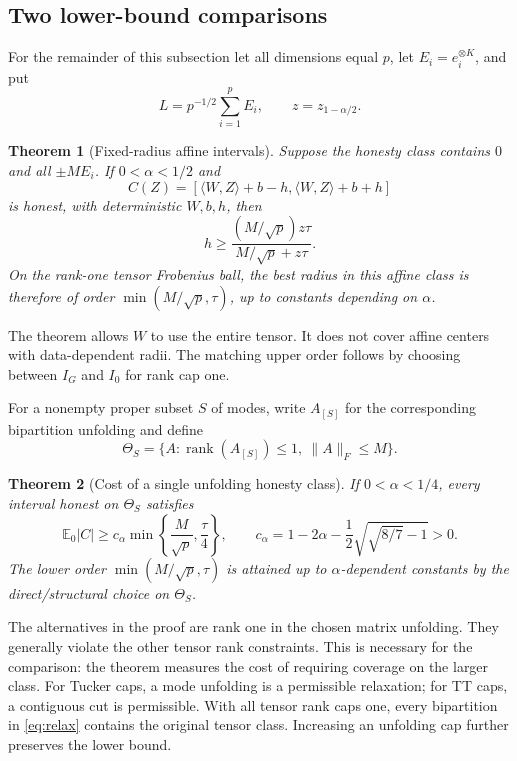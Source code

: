 \documentclass[11pt]{article}
\newtheorem{theorem}{Theorem}
\theoremstyle{remark}
\newcommand{\E}{\mathbb E}
\newcommand{\ip}[2]{\langle #1,#2\rangle}
\newcommand{\norm}[1]{\lVert #1\rVert}
\newcommand{\rank}{\operatorname{rank}}
\begin{document}
\subsection{Two lower-bound comparisons}

For the remainder of this subsection let all dimensions equal $p$, let $E_i=e_i^{\otimes K}$, and put
\begin{equation}\label{eq:equalL}
 L=p^{-1/2}\sum_{i=1}^p E_i,\qquad z=z_{1-\alpha/2}.
\end{equation}

\begin{theorem}[Fixed-radius affine intervals]\label{thm:affine}
Suppose the honesty class contains $0$ and all $\pm M E_i$. If $0<\alpha<1/2$ and
\[
 C(Z)=[\ip WZ+b-h,\ip WZ+b+h]
\]
is honest, with deterministic $W,b,h$, then
\begin{equation}\label{eq:affinelower}
 h\ge\frac{(M/\sqrt p)z\tau}{M/\sqrt p+z\tau}.
\end{equation}
On the rank-one tensor Frobenius ball, the best radius in this affine class is therefore of order $\min(M/\sqrt p,\tau)$, up to constants depending on $\alpha$.
\end{theorem}

The theorem allows $W$ to use the entire tensor. It does not cover affine centers with data-dependent radii. The matching upper order follows by choosing between $I_G$ and $I_0$ for rank cap one.

For a nonempty proper subset $S$ of modes, write $A_{[S]}$ for the corresponding bipartition unfolding and define
\begin{equation}\label{eq:relax}
 \Theta_S=\{A:\rank(A_{[S]})\le1,\ \norm A_F\le M\}.
\end{equation}

\begin{theorem}[Cost of a single unfolding honesty class]\label{thm:unfolding}
If $0<\alpha<1/4$, every interval honest on $\Theta_S$ satisfies
\begin{equation}\label{eq:unfoldlower}
 \E_0|C|\ge c_\alpha\min\left\{\frac M{\sqrt p},\frac\tau4\right\},\qquad
 c_\alpha=1-2\alpha-\frac12\sqrt{\sqrt{8/7}-1}>0.
\end{equation}
The lower order $\min(M/\sqrt p,\tau)$ is attained up to $\alpha$-dependent constants by the direct/structural choice on $\Theta_S$.
\end{theorem}

The alternatives in the proof are rank one in the chosen matrix unfolding. They generally violate the other tensor rank constraints. This is necessary for the comparison: the theorem measures the cost of requiring coverage on the larger class. For Tucker caps, a mode unfolding is a permissible relaxation; for TT caps, a contiguous cut is permissible. With all tensor rank caps one, every bipartition in \eqref{eq:relax} contains the original tensor class. Increasing an unfolding cap further preserves the lower bound.
\end{document}
